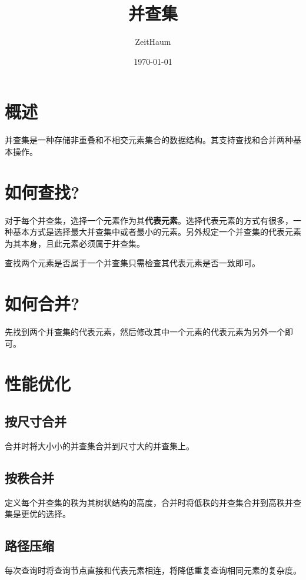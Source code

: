 \documentclass{article}
\author{ZeitHaum}
\date{\today}
\title{并查集}
\begin{document}
    \maketitle
    \newpage 
    \tableofcontents
    \newpage
    \setcounter{page}{1}
    \section{概述}
    并查集是一种存储非重叠和不相交元素集合的数据结构。其支持查找和合并两种基本操作。

    \section{如何查找?}
    对于每个并查集，选择一个元素作为其\textbf{代表元素}。选择代表元素的方式有很多，一种基本方式是选择最大并查集中或者最小的元素。另外规定一个并查集的代表元素为其本身，且此元素必须属于并查集。

    查找两个元素是否属于一个并查集只需检查其代表元素是否一致即可。

    \section{如何合并?}
    先找到两个并查集的代表元素，然后修改其中一个元素的代表元素为另外一个即可。

    \section{性能优化}
    \subsection{按尺寸合并}
    合并时将大小小的并查集合并到尺寸大的并查集上。

    \subsection{按秩合并}
    定义每个并查集的秩为其树状结构的高度，合并时将低秩的并查集合并到高秩并查集是更优的选择。

    \subsection{路径压缩}
    每次查询时将查询节点直接和代表元素相连，将降低重复查询相同元素的复杂度。
\end{document}
